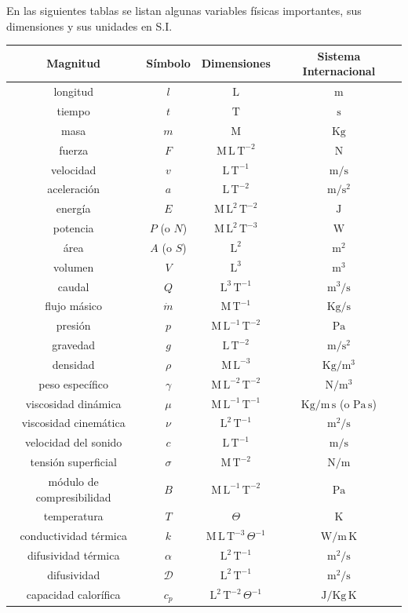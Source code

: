 	En las siguientes tablas se listan algunas variables físicas importantes,
	sus dimensiones y sus unidades en S.I.

	\bigskip

\renewcommand{\arraystretch}{1.3} %
\begin{tabular}{|c|c|c|c|}
	\hline 
	\textbf{Magnitud}  & \textbf{Símbolo}  & \textbf{Dimensiones}  & \textbf{Sistema Internacional} \tabularnewline
	\hline 
	\hline 
	longitud  & $l$  & $\text{L}$  & $\text{m}$ \tabularnewline
	\hline 
	tiempo  & $t$  & $\text{T}$  & $\text{s}$ \tabularnewline
	\hline 
	masa  & $m$  & $\text{M}$  & $\text{Kg}$ \tabularnewline
	\hline 
	fuerza  & $F$  & $\text{M}\,\text{L}\,\text{T}^{-2}$  & N \tabularnewline
	\hline 
	velocidad  & $v$  & $\text{L}\,\text{T}^{-1}$  & $\text{m}/\text{s}$ \tabularnewline
	\hline 
	aceleración  & $a$  & $\text{L}\,\text{T}^{-2}$  & $\text{m}/\text{s}^{2}$ \tabularnewline
	\hline 
	energía  & $E$  & $\text{M}\,\text{L}^{2}\,\text{T}^{-2}$  & $\text{J}$ \tabularnewline
	\hline 
	potencia  & $P$ (o $N$)  & $\text{M}\,\text{L}^{2}\,\text{T}^{-3}$  & $\text{W}$ \tabularnewline
	\hline 
	área  & $A$ (o $S$)  & $\text{L}^{2}$  & $\text{m}^{2}$\tabularnewline
	\hline 
	volumen  & $V$  & $\text{L}^{3}$  & $\text{m}^{3}$ \tabularnewline
	\hline 
	caudal  & $Q$  & $\text{L}^{3}\,\text{T}^{-1}$  & $\text{m}^{3}/\text{s}$ \tabularnewline
	\hline 
	flujo másico  & $\dot{m}$  & $\text{M}\,\text{T}^{-1}$  & $\text{Kg}/\text{s}$ \tabularnewline
	\hline 
	presión  & $p$  & $\text{M}\,\text{L}^{-1}\,\text{T}^{-2}$  & $\text{Pa}$ \tabularnewline
	\hline 
	gravedad  & $g$  & $\text{L}\,\text{T}^{-2}$  & $\text{m}/\text{s}^{2}$ \tabularnewline
	\hline 
	densidad  & $\rho$  & $\text{M}\,\text{L}^{-3}$  & $\text{Kg}/\text{m}^{3}$ \tabularnewline
	\hline 
	peso específico  & $\gamma$  & $\text{M}\,\text{L}^{-2}\,\text{T}^{-2}$  & $\text{N}/\text{m}^{3}$ \tabularnewline
	\hline 
	viscosidad dinámica  & $\mu$  & $\text{M}\,\text{L}^{-1}\,\text{T}^{-1}$  & $\text{Kg}/\text{m}\,\text{s}$ (o $\text{Pa}\,\text{s}$) \tabularnewline
	\hline 
	viscosidad cinemática  & $\nu$  & $\text{L}^{2}\,\text{T}^{-1}$  & $\text{m}^{2}/\text{s}$ \tabularnewline
	\hline 
	velocidad del sonido  & $c$  & $\text{L}\,\text{T}^{-1}$  & $\text{m}/\text{s}$ \tabularnewline
	\hline 
	tensión superficial  & $\sigma$  & $\text{M}\,\text{T}^{-2}$  & $\text{N}/\text{m}$ \tabularnewline
	\hline 
	módulo de compresibilidad  & $B$  & $\text{M}\,\text{L}^{-1}\,\text{T}^{-2}$  & $\text{Pa}$ \tabularnewline
	\hline 
	temperatura  & $T$  & $\Theta$  & K\tabularnewline
	\hline 
	conductividad térmica  & $k$  & $\text{M}\,\text{L}\,\text{T}^{-3}\,\Theta^{-1}$  & $\text{W}/\text{m}\,\text{K}$ \tabularnewline
	\hline 
	difusividad térmica  & $\alpha$  & $\text{L}^{2}\,\text{T}^{-1}$  & $\text{m}^{2}/\text{s}$ \tabularnewline
	\hline 
	difusividad  & $\mathcal{D}$  & $\text{L}^{2}\,\text{T}^{-1}$  & $\text{m}^{2}/\text{s}$ \tabularnewline
	\hline 
	capacidad calorífica  & $c_{p}$  & $\text{L}^{2}\,\text{T}^{-2}\,\Theta^{-1}$  & $\text{J}/\text{Kg}\,\text{K}$ \tabularnewline
	\hline 
\end{tabular}
\renewcommand{\arraystretch}{1}
	\bigskip


